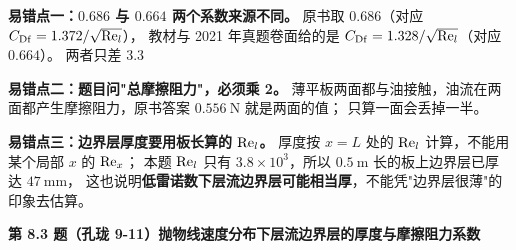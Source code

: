 \begin{yicuo}
\textbf{易错点一：$0.686$ 与 $0.664$ 两个系数来源不同。}
原书取 $0.686$（对应 $C_{\mathrm{Df}}=1.372/\sqrt{\mathrm{Re}_l}$），
教材与 2021 年真题卷面给的是 $C_{\mathrm{Df}}=1.328/\sqrt{\mathrm{Re}_l}$（对应 $0.664$）。
两者只差 3.3%

\textbf{易错点二：题目问"总摩擦阻力"，必须乘 2。}
薄平板两面都与油接触，油流在两面都产生摩擦阻力，原书答案 $0.556\ \mathrm{N}$ 就是两面的值；
只算一面会丢掉一半。

\textbf{易错点三：边界层厚度要用板长算的 $\mathrm{Re}_l$。}
厚度按 $x=L$ 处的 $\mathrm{Re}_l$ 计算，不能用某个局部 $x$ 的 $\mathrm{Re}_x$；
本题 $\mathrm{Re}_l$ 只有 $3.8\times10^{3}$，所以 $0.5\ \mathrm{m}$ 长的板上边界层已厚达 $47\ \mathrm{mm}$，
这也说明\textbf{低雷诺数下层流边界层可能相当厚}，不能凭"边界层很薄"的印象去估算。
\end{yicuo}

\noindent\textbf{第 8.3 题（孔珑 9-11）\quad 抛物线速度分布下层流边界层的厚度与摩擦阻力系数}

